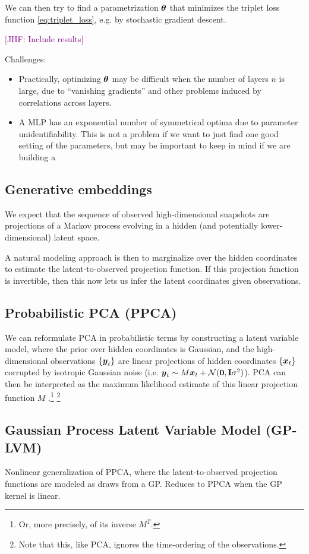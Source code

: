 \documentclass[aps,prl,preprint,nofootinbib,superscriptaddress,linenumbers]{revtex4-1}
\newcommand{\bfv}[1]{{\mbox{\boldmath{$#1$}}}}
\newcommand{\bfm}[1]{{\bf #1}}
\newcommand{\x}{\bfv{x}}
\newcommand{\y}{\bfv{y}}
\newcommand{\params}{\bfv{\theta}}
\newcommand{\jhfcomment}[1]{\textcolor{purple}{[JHF: #1]}} 	%
\begin{document}
We can then try to find a parametrization $\params$ that minimizes the triplet loss function \ref{eq:triplet_loss}, e.g. by stochastic gradient descent.

\jhfcomment{Include results}

Challenges:
\begin{itemize}
	\item Practically, optimizing $\params$ may be difficult when the number of layers $n$ is large, due to ``vanishing gradients'' and other problems induced by correlations across layers.
	\item A MLP has an exponential number of symmetrical optima due to parameter unidentifiability. This is not a problem if we want to just find one good setting of the parameters, but may be important to keep in mind if we are building a 
\end{itemize}

\subsection{Generative embeddings}
We expect that the sequence of observed high-dimensional snapshots are projections of a Markov process evolving in a hidden (and potentially lower-dimensional) latent space.

A natural modeling approach is then to marginalize over the hidden coordinates to estimate the latent-to-observed projection function. If this projection function is invertible, then this now lets us infer the latent coordinates given observations.

\subsection{Probabilistic PCA (PPCA)}
We can reformulate PCA in probabilistic terms by constructing a latent variable model, where the prior over hidden coordinates is Gaussian, and the high-dimensional observations $\{ \y_t \}$ are linear projections of hidden coordinates $\{ \x_t \}$ corrupted by isotropic Gaussian noise (i.e. $\y_t \sim M \x_t + \mathcal{N}(\bfv{0},\bfm{I} \sigma^2) $). PCA can then be interpreted as the maximum likelihood estimate of this linear projection function $M$ .\footnote{Or, more precisely, of its inverse $M^T$.} \footnote{Note that this, like PCA, ignores the time-ordering of the observations.}

\subsection{Gaussian Process Latent Variable Model (GP-LVM)}
Nonlinear generalization of PPCA, where the latent-to-observed projection functions are modeled as draws from a GP. Reduces to PPCA when the GP kernel is linear.
\end{document}
